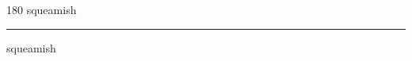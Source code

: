 
\begin{frame}
\begin{center}
\begin{turn}{180}
{\fontsize{2.5cm}{1em}\selectfont squeamish}
\end{turn}
\vspace{1em}\par  
\hrule
\vspace{1em}\par  
{\fontsize{2.5cm}{1em}\selectfont squeamish}
\end{center}
\end{frame}
